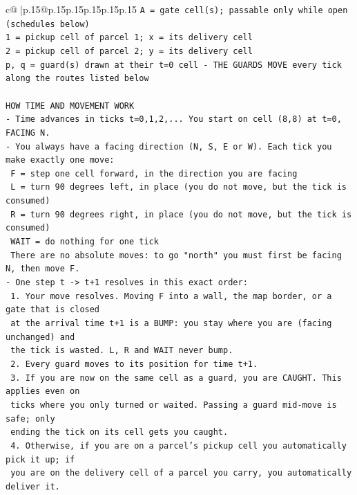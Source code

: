 \documentclass{article}
\begin{document}
{\begin{supertabular}{c@{$\;$}|p{.15\linewidth}@{}p{.15\linewidth}p{.15\linewidth}p{.15\linewidth}p{.15\linewidth}p{.15\linewidth}}
{{{\texttt{A = gate cell(s); passable only while open (schedules below)} \\
\texttt{1 = pickup cell of parcel 1; x = its delivery cell} \\
\texttt{2 = pickup cell of parcel 2; y = its delivery cell} \\
\texttt{p, q = guard(s) drawn at their t=0 cell {-} THE GUARDS MOVE every tick along the routes listed below} \\
\\ 
\texttt{HOW TIME AND MOVEMENT WORK} \\
\texttt{{-} Time advances in ticks t=0,1,2,... You start on cell (8,8) at t=0, FACING N.} \\
\texttt{{-} You always have a facing direction (N, S, E or W). Each tick you make exactly one move:} \\
\texttt{  F    = step one cell forward, in the direction you are facing} \\
\texttt{  L    = turn 90 degrees left, in place (you do not move, but the tick is consumed)} \\
\texttt{  R    = turn 90 degrees right, in place (you do not move, but the tick is consumed)} \\
\texttt{  WAIT = do nothing for one tick} \\
\texttt{  There are no absolute moves: to go "north" you must first be facing N, then move F.} \\
\texttt{{-} One step t {-}> t+1 resolves in this exact order:} \\
\texttt{  1. Your move resolves. Moving F into a wall, the map border, or a gate that is closed} \\
\texttt{     at the arrival time t+1 is a BUMP: you stay where you are (facing unchanged) and} \\
\texttt{     the tick is wasted. L, R and WAIT never bump.} \\
\texttt{  2. Every guard moves to its position for time t+1.} \\
\texttt{  3. If you are now on the same cell as a guard, you are CAUGHT. This applies even on} \\
\texttt{     ticks where you only turned or waited. Passing a guard mid{-}move is safe; only} \\
\texttt{     ending the tick on its cell gets you caught.} \\
\texttt{  4. Otherwise, if you are on a parcel's pickup cell you automatically pick it up; if} \\
\texttt{     you are on the delivery cell of a parcel you carry, you automatically deliver it.} \\
}}}
\end{supertabular}}
\end{document}
